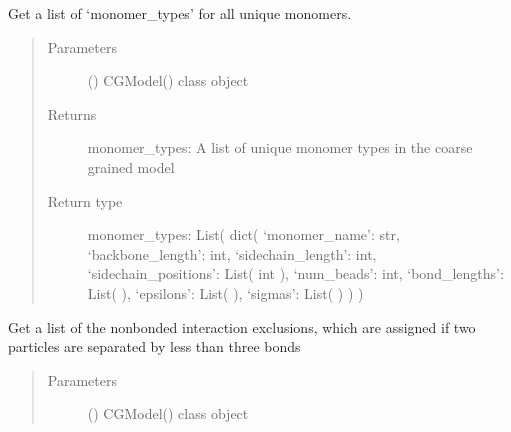 \documentclass[letterpaper,12pt,english,openany,oneside]{sphinxmanual}
\begin{document}
\begin{fulllineitems}
\begin{fulllineitems}
\end{fulllineitems}


\begin{fulllineitems}
\label{\detokenize{cg_model:cg_model.cgmodel.CGModel.get_monomer_types}}
Get a list of ‘monomer\_types’ for all unique monomers.
\begin{quote}\begin{description}
\item[{Parameters}] \leavevmode
{} () \textendash{} CGModel() class object

\item[{Returns}] \leavevmode
monomer\_types: A list of unique monomer types in the coarse grained model

\item[{Return type}] \leavevmode

monomer\_types: List( dict( ‘monomer\_name’: str, ‘backbone\_length’: int, ‘sidechain\_length’: int, ‘sidechain\_positions’: List( int ), ‘num\_beads’: int, ‘bond\_lengths’: List(  ), ‘epsilons’: List(  ), ‘sigmas’: List(  ) ) )


\end{description}\end{quote}

\end{fulllineitems}


\begin{fulllineitems}
\label{\detokenize{cg_model:cg_model.cgmodel.CGModel.get_nonbonded_exclusion_list}}
Get a list of the nonbonded interaction exclusions, which are assigned if two particles are separated by less than three bonds
\begin{quote}\begin{description}
\item[{Parameters}] \leavevmode
{} () \textendash{} CGModel() class object


\end{description}
\end{quote}
\end{fulllineitems}
\end{fulllineitems}
\end{document}
